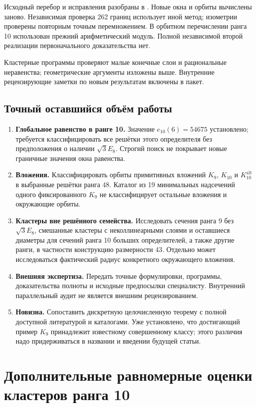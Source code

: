 \documentclass[11pt,a4paper]{article}
\theoremstyle{remark}\newtheorem{remark}[theorem]{Замечание}
\newcommand{\Kalt}{K_{10}^{\mathrm{alt}}}
\begin{document}
Исходный перебор и исправления разобраны в \cite{audit}. Новые окна и орбиты вычислены заново. Независимая проверка 262 границ использует иной метод; изометрии проверены повторным точным перемножением. В орбитном перечислении ранга 10 использован прежний арифметический модуль. Полной независимой второй реализации первоначального доказательства нет.

Кластерные программы проверяют малые конечные слои и рациональные неравенства; геометрические аргументы изложены выше. Внутренние рецензирующие заметки по новым результатам включены в пакет.

\subsection{Точный оставшийся объём работы}

\begin{enumerate}
\item \textbf{Глобальное равенство в ранге 10.} Значение $e_{10}(6)=54675$ установлено; требуется классифицировать все решётки этого определителя без предположения о наличии $\sqrt3E_8$. Строгий поиск не покрывает новые граничные значения окна равенства.
\item \textbf{Вложения.} Классифицировать орбиты примитивных вложений $K_9$, $K_{10}$ и $\Kalt$ в выбранные решётки ранга 48. Каталог из 19 минимальных надсечений одного фиксированного $K_9$ не классифицирует остальные вложения и окружающие орбиты.
\item \textbf{Кластеры вне решённого семейства.} Исследовать сечения ранга 9 без $\sqrt3E_8$, смешанные кластеры с неколлинеарными слоями и оставшиеся диаметры для сечений ранга 10 больших определителей, а также другие ранги, в частности конструкцию размерности 43. Отдельно может исследоваться фактический радиус конкретного окружающего вложения.
\item \textbf{Внешняя экспертиза.} Передать точные формулировки, программы, доказательства полноты и исходные предпосылки специалисту. Внутренний параллельный аудит не является внешним рецензированием.
\item \textbf{Новизна.} Сопоставить дискретную целочисленную теорему с полной доступной литературой и каталогами. Уже установлено, что достигающий пример $K_9$ принадлежит известному совершенному классу; этого различия надо придерживаться в названии и введении будущей статьи.
\end{enumerate}

\newpage
\appendix
\section{Дополнительные равномерные оценки кластеров ранга 10}\label{app:uniform10}
\end{document}
